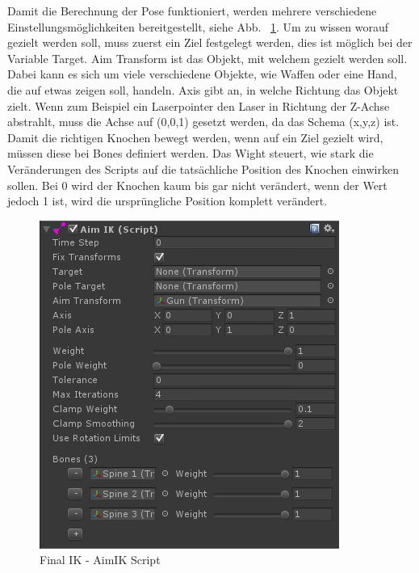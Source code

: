 Damit die Berechnung der Pose funktioniert, werden mehrere verschiedene Einstellungsmöglichkeiten bereitgestellt, siehe Abb. ~\ref{fig:finalIK_aimIK_script}.
Um zu wissen worauf gezielt werden soll, muss zuerst ein Ziel festgelegt werden, dies ist möglich bei der Variable Target.
Aim Transform ist das Objekt, mit welchem gezielt werden soll.
Dabei kann es sich um viele verschiedene Objekte, wie Waffen oder eine Hand, die auf etwas zeigen soll, handeln.
Axis gibt an, in welche Richtung das Objekt zielt.
Wenn zum Beispiel ein Laserpointer den Laser in Richtung der Z-Achse abstrahlt, muss die Achse auf (0,0,1) gesetzt werden, da das Schema (x,y,z) ist.
Damit die richtigen Knochen bewegt werden, wenn auf ein Ziel gezielt wird, müssen diese bei Bones definiert werden.
Das Wight steuert, wie stark die Veränderungen des Scripts auf die tatsächliche Position des Knochen einwirken sollen.
Bei 0 wird der Knochen kaum bis gar nicht verändert, wenn der Wert jedoch 1 ist, wird die ursprüngliche Position komplett verändert.
\begin {figure}
    \centering
    \includegraphics[scale=0.7]{pics/finalik_aimik_script}
    \caption{Final IK - AimIK Script}
    \label{fig:finalIK_aimIK_script}
\end {figure}
~\cite{FinalIK_AimIK_2021}

